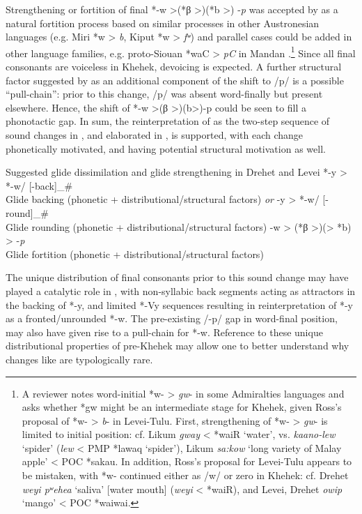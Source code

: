 \documentclass[output=paper]{langscibook}
\begin{document}
Strengthening or fortition of final *-w >(*β >)(*b >) -\textit{p} was accepted by \citet{Blust2005} as a natural fortition process based on similar processes in other Austronesian languages (e.g. Miri *w > \textit{b}, Kiput *w > \textit{fʷ}) and parallel cases could be added in other language families, e.g. proto-Siouan *waC > \textit{pC} in Mandan \citep[69]{Larson2016}.\footnote{A reviewer notes word-initial *w- > \textit{gw}- in some Admiralties languages \citep[321]{Ross1988} and asks whether *gw might be an intermediate stage for Khehek, given Ross’s proposal of *w- > \textit{b}- in Levei-Tulu. First, strengthening of *w- > \textit{gw}- is limited to initial position: cf. Likum \textit{gway} < *waiR ‘water’, vs. \textit{kaano-lew} ‘spider’ (\textit{lew} < PMP *lawaq ‘spider’), Likum \textit{sa:kow} ‘long variety of Malay apple’ < POC *sakau. In addition, Ross’s proposal for Levei-Tulu appears to be mistaken, with *w- continued either as \mbox{/w/} or zero in Khehek: cf. Drehet \textit{weyi pʷehea} ‘saliva’ [water mouth] (\textit{weyi} < *waiR), and Levei, Drehet \textit{owip} ‘mango’ < POC *waiwai.}  Since all final consonants are voiceless in Khehek, devoicing is expected. A further structural factor suggested by \citet[236]{Blust2005} as an additional component of the shift to \mbox{/p/} is a possible “pull-chain”: prior to this change, \mbox{/p/} was absent word-finally but present elsewhere. Hence, the shift of *-w >(β >)(b>)-p could be seen to fill a phonotactic gap. In sum, the reinterpretation of  as the two-step sequence of sound changes in , and elaborated in , is supported, with each change phonetically motivated, and having potential structural motivation as well.

\ea%
    \label{ex:blevins:6}
         Suggested glide dissimilation and glide strengthening in Drehet and Levei
    \ea\label{ex:blevins:6a}
        \ea\label{ex:blevins:6ai} *-y > *-w/ [-back]\_\#  \\ Glide backing (phonetic + distributional/structural factors) \textit{or}
        \ex *-y > *-w/ [-round]\_\# \\   Glide rounding (phonetic + distributional/structural factors)
        \z
    \ex *-w > (*β >)(> *b) > -\textit{p}  \\ Glide fortition (phonetic + distributional/structural factors)
    \z
\z


The unique distribution of final consonants prior to this sound change may have played a catalytic role in , with non-syllabic back segments acting as attractors in the backing of *-y, and limited *-Vy sequences resulting in reinterpretation of *-y as a fronted/unrounded *-w. The pre-existing /-p/ gap in word-final position, may also have given rise to a pull-chain for *-w. Reference to these unique distributional properties of pre-Khehek may allow one to better understand why changes like  are typologically rare.
\end{document}
